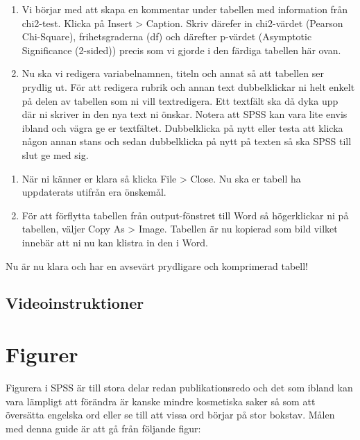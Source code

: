 \documentclass[
]{book}
\begin{document}
\begin{enumerate}
\def\labelenumi{\arabic{enumi}.}
\setcounter{enumi}{5}
\item
  Vi börjar med att skapa en kommentar under tabellen med information från chi2-test. Klicka på Insert \textgreater{} Caption. Skriv därefer in chi2-värdet (Pearson Chi-Square), frihetsgraderna (df) och därefter p-värdet (Asymptotic Significance (2-sided)) precis som vi gjorde i den färdiga tabellen här ovan.
\item
  Nu ska vi redigera variabelnamnen, titeln och annat så att tabellen ser prydlig ut. För att redigera rubrik och annan text dubbelklickar ni helt enkelt på delen av tabellen som ni vill textredigera. Ett textfält ska då dyka upp där ni skriver in den nya text ni önskar. Notera att SPSS kan vara lite envis ibland och vägra ge er textfältet. Dubbelklicka på nytt eller testa att klicka någon annan stans och sedan dubbelklicka på nytt på texten så ska SPSS till slut ge med sig.
\end{enumerate}

\begin{enumerate}
\def\labelenumi{\arabic{enumi}.}
\setcounter{enumi}{7}
\item
  När ni känner er klara så klicka File \textgreater{} Close. Nu ska er tabell ha uppdaterats utifrån era önskemål.
\item
  För att förflytta tabellen från output-fönstret till Word så högerklickar ni på tabellen, väljer Copy As \textgreater{} Image. Tabellen är nu kopierad som bild vilket innebär att ni nu kan klistra in den i Word.
\end{enumerate}

Nu är nu klara och har en avsevärt prydligare och komprimerad tabell!

\hypertarget{videoinstruktioner-14}{%
\subsection{Videoinstruktioner}\label{videoinstruktioner-14}}

\hypertarget{figurer}{%
\section{Figurer}\label{figurer}}

Figurera i SPSS är till stora delar redan publikationsredo och det som ibland kan vara lämpligt att förändra är kanske mindre kosmetiska saker så som att översätta engelska ord eller se till att vissa ord börjar på stor bokstav. Målen med denna guide är att gå från följande figur:
\end{document}
